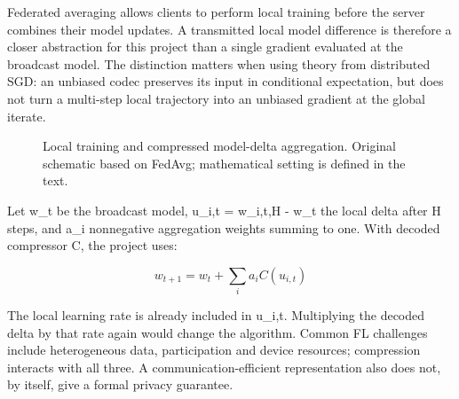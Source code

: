 \documentclass[11pt,a4paper]{article}
\begin{document}
Federated averaging allows clients to perform local training before the server combines their model updates. A transmitted local model difference is therefore a closer abstraction for this project than a single gradient evaluated at the broadcast model. The distinction matters when using theory from distributed SGD: an unbiased codec preserves its input in conditional expectation, but does not turn a multi-step local trajectory into an unbiased gradient at the global iterate. \parencite{mcmahan2017fedavg,wang2021fieldguide}

\begin{figure}[htbp]\centering
{}
\caption{Local training and compressed model-delta aggregation. Original schematic based on FedAvg; mathematical setting is defined in the text.}
\label{fig:fl}
\end{figure}

Let w\_t be the broadcast model, u\_i,t = w\_i,t,H - w\_t the local delta after H steps, and a\_i nonnegative aggregation weights summing to one. With decoded compressor C, the project uses:

\begin{equation*}w_{t+1} = w_t + \sum_i a_i C(u_{i,t})\end{equation*}

The local learning rate is already included in u\_i,t. Multiplying the decoded delta by that rate again would change the algorithm. Common FL challenges include heterogeneous data, participation and device resources; compression interacts with all three. A communication-efficient representation also does not, by itself, give a formal privacy guarantee. \parencite{kairouz2021advances}
\end{document}

